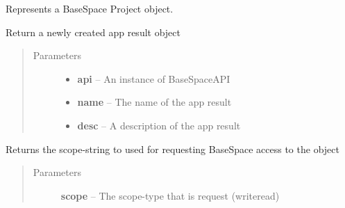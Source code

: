 \documentclass[letterpaper,10pt,english]{sphinxmanual}
\begin{document}
\begin{fulllineitems}
\label{Available modules:BaseSpacePy.model.Project.Project}
Represents a BaseSpace Project object.

\begin{fulllineitems}
\label{Available modules:BaseSpacePy.model.Project.Project.createAppResult}
Return a newly created app result object
\begin{quote}\begin{description}
\item[{Parameters}] \leavevmode\begin{itemize}
\item {} 
\textbf{api} -- An instance of BaseSpaceAPI

\item {} 
\textbf{name} -- The name of the app result

\item {} 
\textbf{desc} -- A description of the app result

\end{itemize}

\end{description}\end{quote}

\end{fulllineitems}


\begin{fulllineitems}
\label{Available modules:BaseSpacePy.model.Project.Project.getAccessStr}
Returns the scope-string to used for requesting BaseSpace access to the object
\begin{quote}\begin{description}
\item[{Parameters}] \leavevmode
\textbf{scope} -- The scope-type that is request (write\textbar{}read)

\end{description}\end{quote}

\end{fulllineitems}


\end{fulllineitems}
\end{document}

